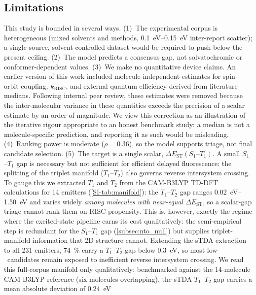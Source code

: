 \subsection{Limitations}\label{subsec:limitations}

This study is bounded in several ways.
(1)~The experimental corpus is heterogeneous (mixed solvents and methods,
\qtyrange{0.1}{0.15}{\electronvolt} inter-report scatter); a single-source,
solvent-controlled dataset would be required to push below the present ceiling.
(2)~The model predicts a consensus gap, not solvatochromic or
conformer-dependent values.
(3)~We make no quantitative device claims. An earlier version of this work included
molecule-independent estimates for spin--orbit coupling, $k_\text{RISC}$, and
external quantum efficiency derived from literature medians. Following internal peer
review, these estimates were removed because the inter-molecular variance in these
quantities exceeds the precision of a scalar estimate by an order of magnitude. We
view this correction as an illustration of the iterative rigour appropriate to an
honest benchmark study: a median is not a molecule-specific prediction, and
reporting it as such would be misleading.
(4)~Ranking power is moderate ($\rho = 0.36$), so the model supports triage, not
final candidate selection.
(5)~The target is a single scalar, $\Delta E_\text{ST}(S_1\text{--}T_1)$. A small
$S_1$--$T_1$ gap is necessary but not sufficient for efficient delayed fluorescence:
the splitting of the triplet manifold ($T_1$--$T_2$) also governs reverse intersystem
crossing.\cite{Keruckiene2024} To gauge this we extracted $T_1$ and $T_2$ from the
CAM-B3LYP TD-DFT calculations for \num{14} emitters (\cref{SI-tab:manifold}): the
$T_1$--$T_2$ gap ranges \qtyrange{0.02}{1.50}{\electronvolt} and varies widely
\emph{among molecules with near-equal $\Delta E_\text{ST}$}, so a scalar-gap triage
cannot rank them on RISC propensity. This is, however, exactly the regime where the
excited-state pipeline earns its cost qualitatively: the semi-empirical step is redundant for the
$S_1$--$T_1$ gap (\cref{subsec:nto_null}) but supplies triplet-manifold information
that 2D structure cannot. Extending the sTDA extraction to all \num{231} emitters,
\qty{74}{\percent} carry a $T_1$--$T_2$ gap below \qty{0.3}{\electronvolt}, so most
low-\deltaest\ candidates remain exposed to inefficient reverse intersystem crossing.
We read this full-corpus manifold only qualitatively: benchmarked against the
\num{14}-molecule CAM-B3LYP reference (six molecules overlapping), the sTDA $T_1$--$T_2$
gap carries a mean absolute deviation of \qty{0.24}{\electronvolt}
